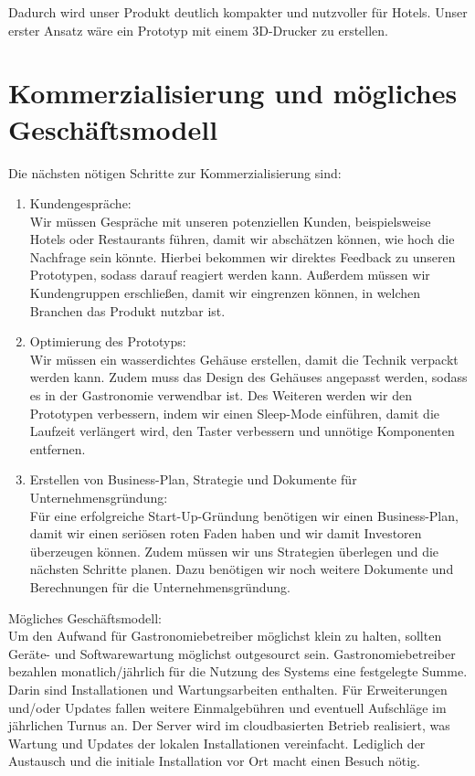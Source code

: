 \noindent
Dadurch wird unser Produkt deutlich kompakter und nutzvoller für Hotels. Unser erster Ansatz wäre ein Prototyp mit einem 3D-Drucker zu erstellen. 
\section{Kommerzialisierung und mögliches Geschäftsmodell}
Die nächsten nötigen Schritte zur Kommerzialisierung sind:
\begin{enumerate}
    \item Kundengespräche:\\
    Wir müssen Gespräche mit unseren potenziellen Kunden, beispielsweise Hotels oder Restaurants führen, damit wir abschätzen können, wie hoch die Nachfrage sein könnte. Hierbei bekommen wir direktes Feedback zu unseren Prototypen, sodass darauf reagiert werden kann. Außerdem müssen wir Kundengruppen erschließen, damit wir eingrenzen können, in welchen Branchen das Produkt nutzbar ist.
    \item Optimierung des Prototyps:\\
    Wir müssen ein wasserdichtes Gehäuse erstellen, damit die Technik verpackt werden kann. Zudem muss das Design des Gehäuses angepasst werden, sodass es in der Gastronomie verwendbar ist. Des Weiteren werden wir den Prototypen verbessern, indem wir einen Sleep-Mode einführen, damit die Laufzeit verlängert wird, den Taster verbessern und unnötige Komponenten entfernen.
    \item Erstellen von Business-Plan, Strategie und Dokumente für Unternehmensgründung:\\
    Für eine erfolgreiche Start-Up-Gründung benötigen wir einen Business-Plan, damit wir einen seriösen roten Faden haben und wir damit Investoren überzeugen können. Zudem müssen wir uns Strategien überlegen und die nächsten Schritte planen. Dazu benötigen wir noch weitere Dokumente und Berechnungen für die Unternehmensgründung.
\end{enumerate}

\noindent
Mögliches Geschäftsmodell: \\
Um den Aufwand für Gastronomiebetreiber möglichst klein zu halten, sollten Geräte- und Softwarewartung möglichst outgesourct sein. 
Gastronomiebetreiber bezahlen monatlich/jährlich für die Nutzung des Systems eine festgelegte Summe. 
Darin sind Installationen und Wartungsarbeiten enthalten. Für Erweiterungen und/oder Updates fallen weitere Einmalgebühren und eventuell Aufschläge im jährlichen Turnus an. Der Server wird im cloudbasierten Betrieb realisiert, was Wartung und Updates der lokalen Installationen vereinfacht. Lediglich der Austausch und die initiale Installation vor Ort macht einen Besuch nötig.

\nocite{online:getting-started-load-cells}
\nocite{doc:getting-started}
\nocite{wiki:load-cell}
\nocite{wiki:Force-sensing-resistor}
\nocite{wiki:Piezoelectric-sensor}
\nocite{online:ic880a-gateway}
\nocite{online:datalink}
\nocite{online:lorawan-security}
\nocite{excel:lorawan-airtime}
\nocite{picture:spreading-factor}
\nocite{picture:lorawan}
\nocite{doc:rn2483}
\nocite{doc:lora-documentation}

\printbibliography
